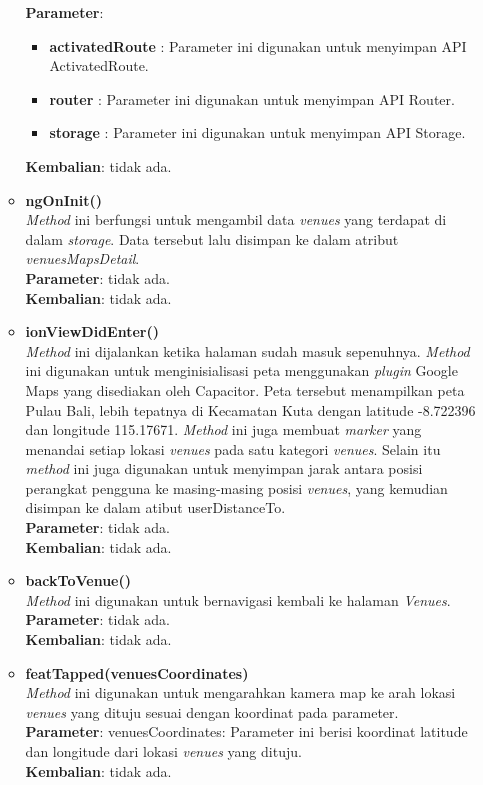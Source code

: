 \begin{enumerate}
\begin{itemize}
						\textbf{Parameter}:
						\begin{itemize}
							\item \textbf{activatedRoute} : Parameter ini digunakan untuk menyimpan API ActivatedRoute.
							\item \textbf{router} : Parameter ini digunakan untuk menyimpan API Router.
							\item \textbf{storage} : Parameter ini digunakan untuk menyimpan API Storage.
						\end{itemize}
						\textbf{Kembalian}: tidak ada.
						
					\item \textbf{ngOnInit()}\\ 
					\textit{Method} ini berfungsi untuk mengambil data \textit{venues} yang terdapat di dalam \textit{storage}. Data tersebut lalu disimpan ke dalam atribut \textit{venuesMapsDetail}. \\
					\textbf{Parameter}: tidak ada. \\
					\textbf{Kembalian}: tidak ada.
						
					\item \textbf{ionViewDidEnter()} \\
						\textit{Method} ini dijalankan ketika halaman sudah masuk sepenuhnya. \textit{Method} ini digunakan untuk menginisialisasi peta menggunakan \textit{plugin} Google Maps yang disediakan oleh Capacitor. Peta tersebut menampilkan peta Pulau Bali, lebih tepatnya di Kecamatan Kuta dengan latitude -8.722396 dan longitude 115.17671. \textit{Method} ini juga membuat \textit{marker} yang menandai setiap lokasi \textit{venues} pada satu kategori \textit{venues}. Selain itu \textit{method} ini juga digunakan untuk menyimpan jarak antara posisi perangkat pengguna ke masing-masing posisi \textit{venues}, yang kemudian disimpan ke dalam atibut userDistanceTo.\\
						\textbf{Parameter}: tidak ada. \\
						\textbf{Kembalian}: tidak ada.
						
					\item \textbf{backToVenue()} \\
						\textit{Method} ini digunakan untuk bernavigasi kembali ke halaman \textit{Venues}. \\
						\textbf{Parameter}: tidak ada. \\
						\textbf{Kembalian}: tidak ada.
						
					\item \textbf{featTapped(venuesCoordinates)} \\
						\textit{Method} ini digunakan untuk mengarahkan kamera map ke arah lokasi \textit{venues} yang dituju sesuai dengan koordinat pada parameter. \\
						\textbf{Parameter}: venuesCoordinates: Parameter ini berisi koordinat latitude dan longitude dari lokasi \textit{venues} yang dituju. \\
						\textbf{Kembalian}: tidak ada.
						

\end{itemize}
\end{enumerate}
